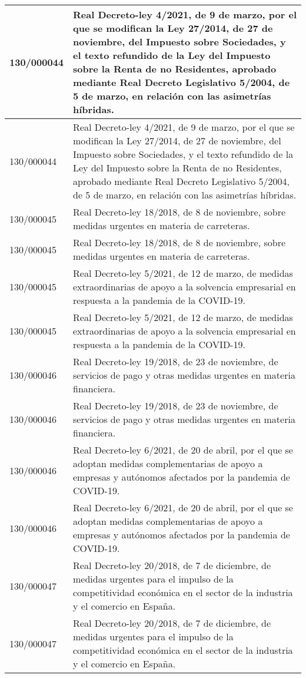 {\begin{table}[H]
\begin{center}
\begin{tabularx}{\linewidth}{| l | X |}
\hline
130/000044 & Real Decreto-ley 4/2021, de 9 de marzo, por el que se modifican la Ley 27/2014, de 27 de noviembre, del Impuesto sobre Sociedades, y el texto refundido de la Ley del Impuesto sobre la Renta de no Residentes, aprobado mediante Real Decreto Legislativo 5/2004, de 5 de marzo, en relación con las asimetrías híbridas. \\
\hline
130/000044 & Real Decreto-ley 4/2021, de 9 de marzo, por el que se modifican la Ley 27/2014, de 27 de noviembre, del Impuesto sobre Sociedades, y el texto refundido de la Ley del Impuesto sobre la Renta de no Residentes, aprobado mediante Real Decreto Legislativo 5/2004, de 5 de marzo, en relación con las asimetrías híbridas. \\
\hline
130/000045 & Real Decreto-ley 18/2018, de 8 de noviembre, sobre medidas urgentes en materia de carreteras. \\
\hline
130/000045 & Real Decreto-ley 18/2018, de 8 de noviembre, sobre medidas urgentes en materia de carreteras. \\
\hline
130/000045 & Real Decreto-ley 5/2021, de 12 de marzo, de medidas extraordinarias de apoyo a la solvencia empresarial en respuesta a la pandemia de la COVID-19. \\
\hline
130/000045 & Real Decreto-ley 5/2021, de 12 de marzo, de medidas extraordinarias de apoyo a la solvencia empresarial en respuesta a la pandemia de la COVID-19. \\
\hline
130/000046 & Real Decreto-ley 19/2018, de 23 de noviembre, de servicios de pago y otras medidas urgentes en materia financiera. \\
\hline
130/000046 & Real Decreto-ley 19/2018, de 23 de noviembre, de servicios de pago y otras medidas urgentes en materia financiera. \\
\hline
130/000046 & Real Decreto-ley 6/2021, de 20 de abril, por el que se adoptan medidas complementarias de apoyo a empresas y autónomos afectados por la pandemia de COVID-19. \\
\hline
130/000046 & Real Decreto-ley 6/2021, de 20 de abril, por el que se adoptan medidas complementarias de apoyo a empresas y autónomos afectados por la pandemia de COVID-19. \\
\hline
130/000047 & Real Decreto-ley 20/2018, de 7 de diciembre, de medidas urgentes para el impulso de la competitividad económica en el sector de la industria y el comercio en España. \\
\hline
130/000047 & Real Decreto-ley 20/2018, de 7 de diciembre, de medidas urgentes para el impulso de la competitividad económica en el sector de la industria y el comercio en España. \\

\end{tabularx}
\end{center}
\end{table}}
